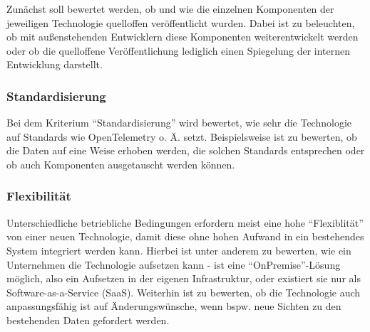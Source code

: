 Zunächst soll bewertet werden, ob und wie die einzelnen Komponenten der jeweiligen Technologie quelloffen veröffentlicht wurden. Dabei ist zu beleuchten, ob mit außenstehenden Entwicklern diese Komponenten weiterentwickelt werden oder ob die quelloffene Veröffentlichung lediglich einen Spiegelung der internen Entwicklung darstellt.

%

\subsubsection{Standardisierung}

Bei dem Kriterium \enquote{Standardisierung} wird bewertet, wie sehr die Technologie auf Standards wie OpenTelemetry o. Ä. setzt. Beispielsweise ist zu bewerten, ob die Daten auf eine Weise erhoben werden, die solchen Standards entsprechen oder ob auch Komponenten ausgetauscht werden können.

\subsubsection{Flexibilität}

Unterschiedliche betriebliche Bedingungen erfordern meist eine hohe \enquote{Flexiblität} von einer neuen Technologie, damit diese ohne hohen Aufwand in ein bestehendes System integriert werden kann. Hierbei ist unter anderem zu bewerten, wie ein Unternehmen die Technologie aufsetzen kann - ist eine \enquote{OnPremise}-Lösung möglich, also ein Aufsetzen in der eigenen Infrastruktur, oder existiert sie nur als Software-as-a-Service (SaaS). Weiterhin ist zu bewerten, ob die Technologie auch anpassungsfähig ist auf Änderungswünsche, wenn bspw. neue Sichten zu den bestehenden Daten gefordert werden.

